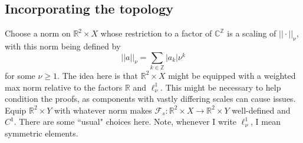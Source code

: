 \documentclass[10pt]{article}
\newcommand{\R}{\mathbb{R}}
\newcommand{\Z}{\mathbb{Z}}
\newcommand{\C}{\mathbb{C}}
\begin{document}
\subsection{Incorporating the topology}
Choose a norm on $\R^2\times X$ whose restriction to a factor of $\C^\Z$ is a scaling of $||\cdot||_\nu$, with this norm being defined by
$$||a||_\nu = \sum_{k\in\Z}|a_k|\nu^k$$ for some $\nu\geq 1$. The idea here is that $\R^2\times X$ might be equipped with a weighted max norm relative to the factors $\R$ and $\ell_\nu^1$. This might be necessary to help condition the proofs, as components with vastly differing scales can cause issues. Equip $\R^2\times Y$ with whatever norm makes $\mathcal{F}_s:\R^2\times X\rightarrow\R^2\times Y$ well-defined and $C^1$. There are some ``usual" choices here. Note, whenever I write $\ell_\nu^1$, I mean symmetric elements.
\end{document}
